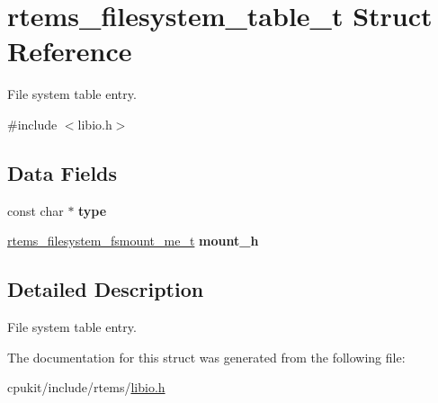 \hypertarget{structrtems__filesystem__table__t}{}\section{rtems\+\_\+filesystem\+\_\+table\+\_\+t Struct Reference}
\label{structrtems__filesystem__table__t}


File system table entry.  




{\ttfamily \#include $<$libio.\+h$>$}

\subsection*{Data Fields}
\begin{DoxyCompactItemize}
\item 
\mbox{\label{structrtems__filesystem__table__t_a6fbf6d2901ae4265e682f0afe186ddef}} 
const char $\ast$ {\bfseries type}
\item 
\mbox{\label{structrtems__filesystem__table__t_abe07849c0d455852f35c4eaf41aae6fb}} 
\mbox{\hyperlink{group__LibIOFSOps_gab86f790d75005100fc4d847f7cdc8aef}{rtems\+\_\+filesystem\+\_\+fsmount\+\_\+me\+\_\+t}} {\bfseries mount\+\_\+h}
\end{DoxyCompactItemize}


\subsection{Detailed Description}
File system table entry. 

The documentation for this struct was generated from the following file\+:\begin{DoxyCompactItemize}
\item 
cpukit/include/rtems/\mbox{\hyperlink{libio_8h}{libio.\+h}}\end{DoxyCompactItemize}
